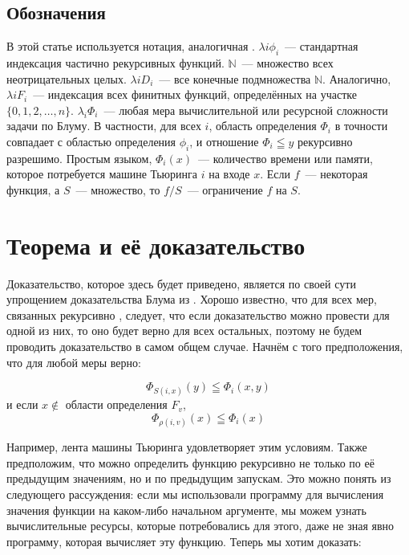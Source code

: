 \documentclass[a4paper,12pt]{report}
\begin{document}
\section{Обозначения}
В этой статье используется нотация, аналогичная \cite{Rogers}. $\lambda i \phi_i$~--- стандартная индексация частично рекурсивных функций. $\mathbb{N}$~--- множество всех неотрицательных целых. $\lambda i D_i$~--- все конечные подмножества $\mathbb{N}$. Аналогично, $\lambda i F_i$~--- индексация всех финитных функций, определённых на участке $\{0, 1, 2, \dots , n\}$. $\lambda_i \Phi_i$~--- любая мера вычислительной или ресурсной сложности задачи по Блуму. В частности, для всех $i$, область определения $\Phi_i$ в точности совпадает с областью определения $\phi_i$, и отношение $\Phi_i \leqq y$ рекурсивно разрешимо. Простым языком, $\Phi_i (x)$~--- количество времени или памяти, которое потребуется машине Тьюринга $i$ на входе $x$. Если $f$~--- некоторая функция, а  $S$~--- множество, то  $f/S$~--- ограничение $f$ на $S$.


\chapter{Теорема и её доказательство}

Доказательство, которое здесь будет приведено, является по своей сути упрощением доказательства Блума из \cite{Blum}. Хорошо известно, что для всех мер, связанных рекурсивно \cite{Blum}, следует, что если доказательство можно провести для одной из них, то оно будет верно для всех остальных, поэтому не будем проводить доказательство в самом общем случае. Начнём с того предположения, что для любой меры верно:

\begin{equation} \label{eq:2.1}
\Phi_{S(i,x)} (y) \leqq \Phi_i (x,y)
\end{equation}
и если $x\notin$ области определения $F_v$, 
\begin{equation} \label{eq:2.2}
\Phi_{\rho (i,v)} (x)\leqq \Phi_i (x) 
\end{equation}

Например, лента машины Тьюринга удовлетворяет этим условиям. Также предположим, что можно определить функцию рекурсивно не только по её предыдущим значениям, но и по предыдущим запускам. Это можно понять из следующего рассуждения: если мы использовали программу для вычисления значения функции на каком-либо начальном аргументе, мы можем узнать вычислительные ресурсы, которые потребовались для этого, даже не зная явно программу, которая вычисляет эту функцию. Теперь мы хотим доказать:
\end{document}
